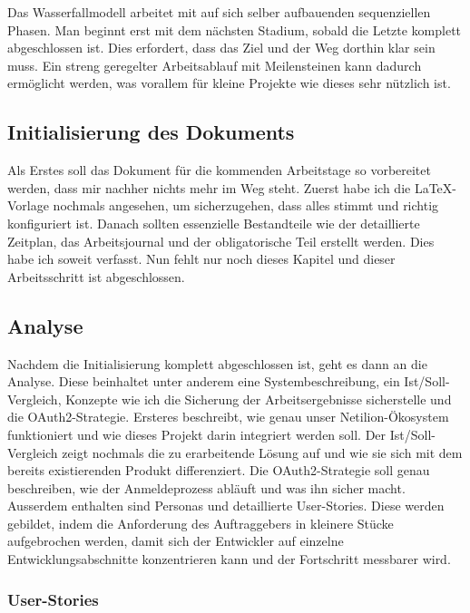 Das Wasserfallmodell arbeitet mit auf sich selber aufbauenden sequenziellen Phasen. Man beginnt erst
mit dem nächsten Stadium, sobald die Letzte komplett abgeschlossen ist. Dies erfordert, dass das Ziel und
der Weg dorthin klar sein muss. Ein streng geregelter Arbeitsablauf mit Meilensteinen kann dadurch
ermöglicht werden, was vorallem für kleine Projekte wie dieses sehr nützlich ist.

\subsection{Initialisierung des Dokuments}

Als Erstes soll das Dokument für die kommenden Arbeitstage so vorbereitet werden, dass mir nachher nichts mehr im Weg steht. Zuerst habe ich die LaTeX-Vorlage nochmals angesehen, um sicherzugehen, dass alles stimmt und richtig konfiguriert ist. Danach sollten essenzielle Bestandteile wie der detaillierte Zeitplan, das Arbeitsjournal und der obligatorische Teil erstellt werden. Dies habe ich soweit verfasst. Nun fehlt nur noch dieses Kapitel und dieser Arbeitsschritt ist abgeschlossen.

\subsection{Analyse}

Nachdem die Initialisierung komplett abgeschlossen ist, geht es dann an die Analyse. Diese beinhaltet unter anderem eine Systembeschreibung, ein Ist/Soll-Vergleich, Konzepte wie ich die Sicherung der Arbeitsergebnisse sicherstelle und die OAuth2-Strategie. Ersteres beschreibt, wie genau unser Netilion-Ökosystem funktioniert und wie dieses Projekt darin integriert werden soll. Der Ist/Soll-Vergleich zeigt nochmals die zu erarbeitende Lösung auf und wie sie sich mit dem bereits existierenden Produkt differenziert. Die OAuth2-Strategie soll genau beschreiben, wie der Anmeldeprozess abläuft und was ihn sicher macht.
\newline
Ausserdem enthalten sind Personas und detaillierte User-Stories. Diese werden gebildet, indem die Anforderung des Auftraggebers in kleinere Stücke aufgebrochen werden, damit sich der Entwickler auf einzelne Entwicklungsabschnitte konzentrieren kann und der Fortschritt messbarer wird.

\subsubsection{User-Stories}

